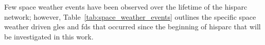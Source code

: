 
Few space weather events have been observed over the lifetime of the \gls{hisparc} network; however, Table~\ref{tab:space_weather_events} outlines the specific space weather driven \glspl{gle} and \glspl{fd} that occurred since the beginning of \gls{hisparc} that will be investigated in this work.


